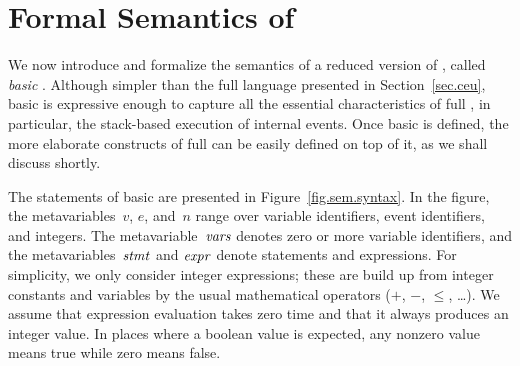 \def\JOT{.8\jot}

\section{Formal Semantics of~\CEU}
\label{sec.sem}

We now introduce and formalize the semantics of a reduced version of \CEU,
called \emph{basic \CEU}.  Although simpler than the full language presented
in Section~\ref{sec.ceu}, basic \CEU is expressive enough to capture all the
essential characteristics of full \CEU, in particular, the stack-based
execution of internal events.  Once basic \CEU is defined, the more
elaborate constructs of full \CEU can be easily defined on top of it, as we
shall discuss shortly.

The statements of basic \CEU are presented in Figure~\ref{fig.sem.syntax}.
In the figure, the metavariables~$v$, $e$, and~$n$ range over variable
identifiers, event identifiers, and integers.  The metavariable~$\mathit{vars}$
denotes zero or more variable identifiers, and the metavariables~$\mathit{stmt}$ and
$\mathit{expr}$ denote statements and expressions.  For simplicity, we only consider
integer expressions; these are build up from integer constants and variables
by the usual mathematical operators ($+$, $-$, $\le$, \ldots).  We assume
that expression evaluation takes zero time and that it always produces an
integer value.  In places where a boolean value is expected, any nonzero
value means true while zero means false.

